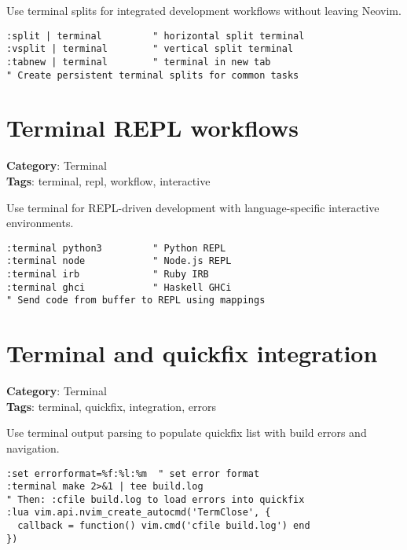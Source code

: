 {{{{{{{{{Use terminal splits for integrated development workflows without leaving Neovim.

\begin{Exa*}{}
\begin{Verbatim}[fontsize=\footnotesize, breaklines, breakanywhere]
:split | terminal         " horizontal split terminal
:vsplit | terminal        " vertical split terminal  
:tabnew | terminal        " terminal in new tab
" Create persistent terminal splits for common tasks
\end{Verbatim}
\end{Exa*}

\section{Terminal REPL workflows}

\textbf{Category}: Terminal\\ \textbf{Tags}: terminal, repl, workflow, interactive
\vspace{0.5cm}

Use terminal for REPL-driven development with language-specific interactive environments.

\begin{Exa*}{}
\begin{Verbatim}[fontsize=\footnotesize, breaklines, breakanywhere]
:terminal python3         " Python REPL
:terminal node            " Node.js REPL
:terminal irb             " Ruby IRB  
:terminal ghci            " Haskell GHCi
" Send code from buffer to REPL using mappings
\end{Verbatim}
\end{Exa*}

\section{Terminal and quickfix integration}

\textbf{Category}: Terminal\\ \textbf{Tags}: terminal, quickfix, integration, errors
\vspace{0.5cm}

Use terminal output parsing to populate quickfix list with build errors and navigation.

\begin{Exa*}{}
\begin{Verbatim}[fontsize=\footnotesize, breaklines, breakanywhere]
:set errorformat=%f:%l:%m  " set error format
:terminal make 2>&1 | tee build.log
" Then: :cfile build.log to load errors into quickfix
:lua vim.api.nvim_create_autocmd('TermClose', {
  callback = function() vim.cmd('cfile build.log') end
})
\end{Verbatim}
\end{Exa*}

}}}}}}}}}
